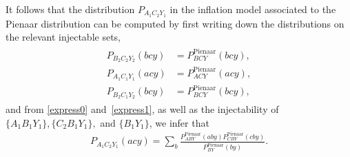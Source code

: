 \documentclass[aps,english,10pt,superscriptaddress,onecolumn,twoside,longbibliography,pra,floatfix,fleqn,nofootinbib]{revtex4-1}
\theoremstyle{definition}
\begin{document}
It follows that the distribution $P_{A_1 C_2 Y_1}$ in the inflation model associated to the Pienaar distribution can be computed by first writing down the distributions on the relevant injectable sets,
\begin{align}
\begin{split}
\label{injsnew}
P_{B_2 C_2 Y_2}(bc y)&= P^{\text{Pienaar}}_{BCY}(bc y), \\
P_{A_1 C_1  Y_1}(ac y)&= P^{\text{Pienaar}}_{ACY}(ac y),\\
P_{B_2 C_1 Y_2}(bc y)&= P^{\text{Pienaar}}_{BCY}(bc y),
\end{split}
\end{align} 
and from \cref{express0} and~\eqref{express1}, as well as the injectability of $\{A_1 B_1 Y_1\}, \{C_2 B_1 Y_1\},$ and $\{B_1 Y_1\}$, 
we infer that 
\begin{align}
P_{A_1 C_2 Y_1}(a c y) = \sum_{b} \frac{P^{\text{Pienaar}}_{A B Y}(a b y) P^{\text{Pienaar}}_{C B Y}(c b y) }{P^{\text{Pienaar}}_{B Y}(b y)}.
\label{express1old}
\end{align}
\end{document}
